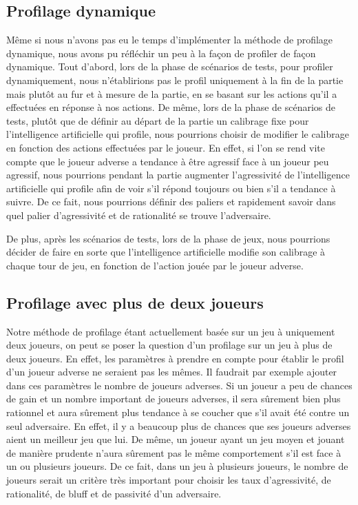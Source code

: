 \documentclass{report}
\begin{document}
\subsection{Profilage dynamique}
\hspace{0.5cm}Même si nous n'avons pas eu le temps d'implémenter la méthode de profilage dynamique, nous avons pu réfléchir un peu à la façon de profiler de façon dynamique. Tout d'abord, lors de la phase de scénarios de tests, pour profiler dynamiquement, nous n'établirions pas le profil uniquement à la fin de la partie mais plutôt au fur et à mesure de la partie, en se basant sur les actions qu'il a effectuées en réponse à nos actions. De même, lors de la phase de scénarios de tests, plutôt que de définir au départ de la partie un calibrage fixe pour l'intelligence artificielle qui profile, nous pourrions choisir de modifier le calibrage en fonction des actions effectuées par le joueur. En effet, si l'on se rend vite compte que le joueur adverse a tendance à être agressif face à un joueur peu agressif, nous pourrions pendant la partie augmenter l'agressivité de l'intelligence artificielle qui profile afin de voir s'il répond toujours ou bien s'il a tendance à suivre. De ce fait, nous pourrions définir des paliers et rapidement savoir dans quel palier d'agressivité et de rationalité se trouve l'adversaire.\par
De plus, après les scénarios de tests, lors de la phase de jeux, nous pourrions décider de faire en sorte que l'intelligence artificielle modifie son calibrage à chaque tour de jeu, en fonction de l'action jouée par le joueur adverse.\par

\subsection{Profilage avec plus de deux joueurs}
\hspace{0.5cm}Notre méthode de profilage étant actuellement basée sur un jeu à uniquement deux joueurs, on peut se poser la question d'un profilage sur un jeu à plus de deux joueurs. En effet, les paramètres à prendre en compte pour établir le profil d'un joueur adverse ne seraient pas les mêmes. Il faudrait par exemple ajouter dans ces paramètres le nombre de joueurs adverses. Si un joueur a peu de chances de gain et un nombre important de joueurs adverses, il sera sûrement bien plus rationnel et aura sûrement plus tendance à se coucher que s'il avait été contre un seul adversaire. En effet, il y a beaucoup plus de chances que ses joueurs adverses aient un meilleur jeu que lui. De même, un joueur ayant un jeu moyen et jouant de manière prudente n'aura sûrement pas le même comportement s'il est face à un ou plusieurs joueurs. De ce fait, dans un jeu à plusieurs joueurs, le nombre de joueurs serait un critère très important pour choisir les taux d'agressivité, de rationalité, de bluff et de passivité d'un adversaire. \par
\end{document}
